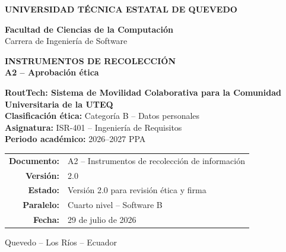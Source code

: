 \documentclass[10pt,a4paper]{article}
\newcommand{\Proyecto}{RoutTech: Sistema de Movilidad Colaborativa para la Comunidad Universitaria de la UTEQ}
\newcommand{\Asignatura}{ISR-401 -- Ingeniería de Requisitos}
\newcommand{\Periodo}{2026--2027 PPA}
\newcommand{\CategoriaEtica}{Categoría B -- Datos personales}
\newcommand{\FechaDocumento}{29 de julio de 2026}
\newcommand{\VersionDocumento}{2.0}
\newcommand{\EstadoDocumento}{Versión 2.0 para revisión ética y firma}
\newcommand{\Paralelo}{Cuarto nivel -- Software B}
\begin{document}
\justifying

\thispagestyle{empty}

\vspace*{0.65cm}
\begin{center}
{\color{white}\Large\bfseries UNIVERSIDAD TÉCNICA ESTATAL DE QUEVEDO}

\vspace{1.75cm}
{\large\bfseries\color{RTForest} Facultad de Ciencias de la Computación\\[4pt]}
{\normalsize\color{RTGray} Carrera de Ingeniería de Software}

\vspace{0.8cm}

{\Huge\bfseries\color{RTForest} INSTRUMENTOS DE RECOLECCIÓN\\[8pt]}
{\Large\bfseries\color{RTTerracotta} A2 -- Aprobación ética}

\vspace{1.0cm}

\begin{tcolorbox}[width=0.90\textwidth,colback=RTCream,colframe=RTGold,boxrule=1pt,arc=2mm]
\centering
{\large\bfseries \Proyecto}\\[7pt]
\textbf{Clasificación ética:} \CategoriaEtica\\
\textbf{Asignatura:} \Asignatura\\
\textbf{Periodo académico:} \Periodo
\end{tcolorbox}

\vfill
\begin{tabular}{rl}
\textbf{Documento:} & A2 -- Instrumentos de recolección de información\\
\textbf{Versión:} & \VersionDocumento\\
\textbf{Estado:} & \EstadoDocumento\\
\textbf{Paralelo:} & \Paralelo\\
\textbf{Fecha:} & \FechaDocumento
\end{tabular}

\vspace{0.75cm}
{\small Quevedo -- Los Ríos -- Ecuador}
\end{center}
\clearpage
\end{document}
